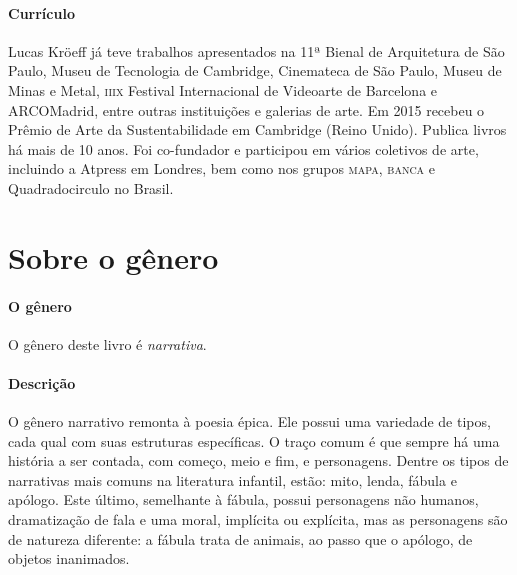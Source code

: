\documentclass[11pt]{extarticle}
\begin{document}
\paragraph{Currículo} Lucas Kröeff já teve trabalhos apresentados na 11ª Bienal de Arquitetura de São Paulo, Museu de Tecnologia de Cambridge, Cinemateca de São Paulo, Museu de Minas e Metal, \textsc{iiix} Festival Internacional de Videoarte de Barcelona e ARCOMadrid, entre outras instituições e galerias de arte. Em 2015 recebeu o Prêmio de Arte da Sustentabilidade em Cambridge (Reino Unido). Publica livros há mais de 10 anos.
Foi co-fundador e participou em vários coletivos de arte, incluindo a Atpress em Londres, bem como nos grupos \textsc{mapa}, \textsc{banca} e Quadradocirculo no Brasil.



\section{Sobre o gênero}

\paragraph{O gênero} O gênero deste livro é \textit{narrativa}. 

\paragraph{Descrição} 
O gênero narrativo remonta à poesia épica. Ele possui uma variedade de tipos, cada qual com suas estruturas específicas. O traço comum é que sempre há uma história a ser contada, com começo, meio e fim, e personagens. Dentre os tipos de narrativas mais comuns na literatura infantil, estão: mito, lenda, fábula e apólogo. Este último, semelhante à fábula, possui personagens não humanos, dramatização de fala e uma moral, implícita ou explícita, mas as personagens são de natureza diferente: a fábula trata de animais, ao passo que o apólogo, de objetos inanimados. 

\end{document}
